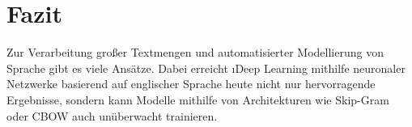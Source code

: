 



\chapter{Fazit}\label{c.fazit}
Zur Verarbeitung großer Textmengen und automatisierter Modellierung von Sprache gibt es viele Ansätze. Dabei erreicht \i{Deep Learning} mithilfe neuronaler Netzwerke basierend auf englischer Sprache heute nicht nur hervorragende Ergebnisse, sondern kann Modelle mithilfe von Architekturen wie Skip-Gram oder CBOW auch unüberwacht trainieren.

